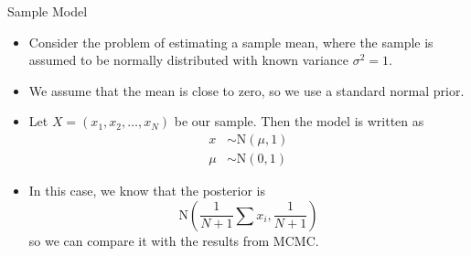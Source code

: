 \documentclass{beamer}
\begin{document}
\begin{frame}{Sample Model}
    \begin{itemize}
        \item Consider the problem of estimating a sample mean, where the sample is
              assumed to be normally distributed with known variance $\sigma^2 = 1$.
        \item We assume that the mean is close to zero, so we use a standard normal
              prior.
        \item Let $X = (x_1,x_2,\dots,x_N)$ be our sample. Then the model is written as
            \begin{align*}
                x &\sim \mathrm{N}(\mu, 1) \\
                \mu &\sim \mathrm{N}(0,1)
            \end{align*}
        \item In this case, we know that the posterior is
            \[ \mathrm{N} \left ( \frac{1}{N+1}\sum x_i, \frac{1}{N+1} \right ) \]
            so we can compare it with the results from MCMC.
    \end{itemize}
\end{frame}
\end{document}
